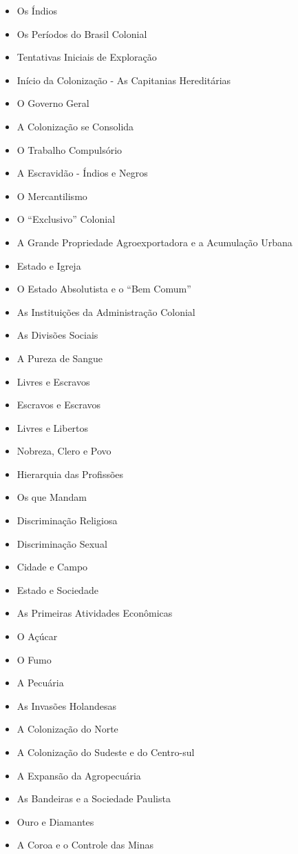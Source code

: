 \documentclass[a4paper,12pt]{article}[abntex2]
\begin{document}
\begin{itemize}
\item Os Índios
\item Os Períodos do Brasil Colonial
\item Tentativas Iniciais de Exploração
\item Início da Colonização - As Capitanias Hereditárias
\item O Governo Geral
\item A Colonização se Consolida
\item O Trabalho Compulsório
\item A Escravidão - Índios e Negros
\item O Mercantilismo
\item O “Exclusivo” Colonial
\item A Grande Propriedade Agroexportadora e a Acumulação Urbana
\item Estado e Igreja
\item O Estado Absolutista e o “Bem Comum”
\item As Instituições da Administração Colonial
\item As Divisões Sociais
\item A Pureza de Sangue
\item Livres e Escravos
\item Escravos e Escravos
\item Livres e Libertos
\item Nobreza, Clero e Povo
\item Hierarquia das Profissões
\item Os que Mandam
\item Discriminação Religiosa
\item Discriminação Sexual
\item Cidade e Campo
\item Estado e Sociedade
\item As Primeiras Atividades Econômicas
\item O Açúcar
\item O Fumo
\item A Pecuária
\item As Invasões Holandesas
\item A Colonização do Norte
\item A Colonização do Sudeste e do Centro-sul
\item A Expansão da Agropecuária
\item As Bandeiras e a Sociedade Paulista
\item Ouro e Diamantes
\item A Coroa e o Controle das Minas

\end{itemize}
\end{document}

